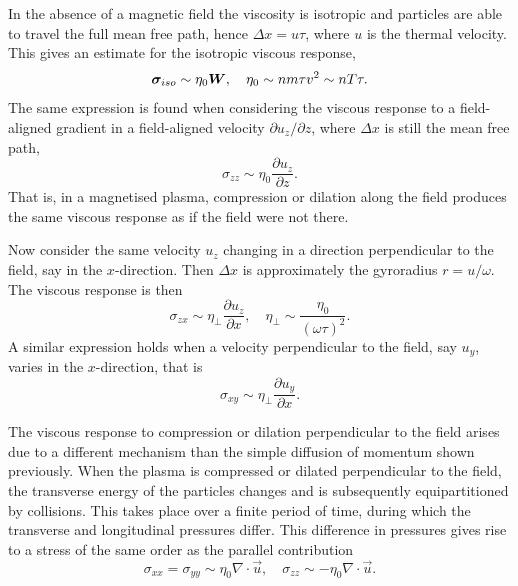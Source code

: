 In the absence of a magnetic field the viscosity is isotropic and particles are able to travel the full mean free path, hence $\Delta x = u \tau$, where $u$ is the thermal velocity. This gives an estimate for the isotropic viscous response,
\begin{equation}
  \label{eq:isotropic_eta_estimate}
  {\bm \sigma}_{iso} \sim \eta_0 {\bm W}, \quad \eta_0 \sim nm\tau v^2 \sim nT \tau.
\end{equation}
The same expression is found when considering the viscous response to a field-aligned gradient in a field-aligned velocity $\partial u_z / \partial z$, where $\Delta x$ is still the mean free path,
\begin{equation}
  \label{eq:parallel_eta_estimate}
\sigma_{zz} \sim \eta_0 \frac{\partial u_z}{\partial z}.
\end{equation}
That is, in a magnetised plasma, compression or dilation along the field produces the same viscous response as if the field were not there.

Now consider the same velocity $u_z$ changing in a direction perpendicular to the field, say in the $x$-direction. Then $\Delta x$ is approximately the gyroradius $r = u/\omega$. The viscous response is then
\begin{equation}
  \label{eq:perp_eta_estimate}
\sigma_{zx} \sim \eta_{\perp} \frac{\partial u_z}{\partial x}, \quad \eta_{\perp} \sim \frac{\eta_0}{(\omega \tau)^2}.
\end{equation}
A similar expression holds when a velocity perpendicular to the field, say $u_y$, varies in the $x$-direction, that is
\begin{equation}
  \label{eq:perp_eta_estimate2}
\sigma_{xy} \sim \eta_{\perp} \frac{\partial u_y}{\partial x}.
\end{equation}

The viscous response to compression or dilation perpendicular to the field arises due to a different mechanism than the simple diffusion of momentum shown previously. When the plasma is compressed or dilated perpendicular to the field, the transverse energy of the particles changes and is subsequently equipartitioned by collisions. This takes place over a finite period of time, during which the transverse and longitudinal pressures differ. This difference in pressures gives rise to a stress of the same order as the parallel contribution
\begin{equation}
  \label{eq:compression_eta_estimate}
\sigma_{xx} = \sigma_{yy} \sim \eta_0 \nabla \cdot \vec{u}, \quad \sigma_{zz} \sim - \eta_0 \nabla \cdot \vec{u}.
\end{equation}

